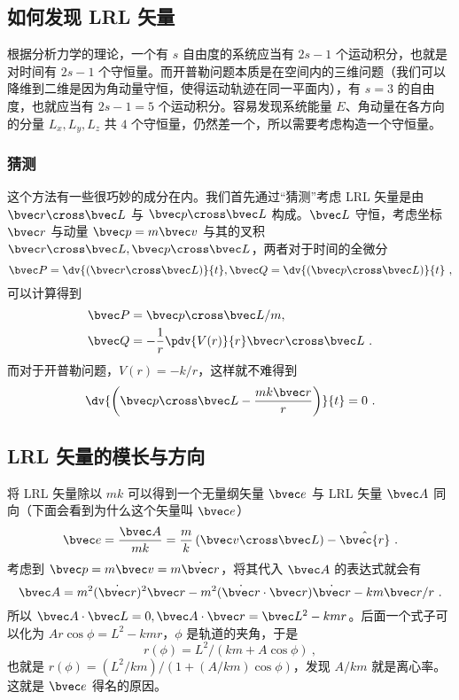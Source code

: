 \subsection{如何发现 LRL 矢量}
根据分析力学的理论，一个有 $s$ 自由度的系统应当有 $2s-1$ 个运动积分，也就是对时间有 $2s-1$ 个守恒量。而开普勒问题本质是在空间内的三维问题（我们可以降维到二维是因为角动量守恒，使得运动轨迹在同一平面内），有 $s=3$ 的自由度，也就应当有 $2s-1=5$ 个运动积分。容易发现系统能量 $E$、角动量在各方向的分量 $L_x, L_y, L_z$ 共 $4$ 个守恒量，仍然差一个，所以需要考虑构造一个守恒量。

\subsubsection{猜测}
这个方法有一些很巧妙的成分在内。我们首先通过“猜测”考虑 LRL 矢量是由 $\bvec r \cross \bvec L$ 与 $\bvec p \cross \bvec L$ 构成。$\bvec L$ 守恒，考虑坐标 $\bvec r$ 与动量 $\bvec p=m\bvec v$ 与其的叉积
$\bvec r \cross \bvec L, \bvec p \cross \bvec L$，两者对于时间的全微分
$$\bvec P= \dv{\left(\bvec r \cross \bvec L\right)}{t}, \bvec Q =\dv{\left(\bvec p \cross \bvec L\right)}{t} ~,$$
可以计算得到
$$\begin{aligned}
\bvec P &= \bvec p \cross \bvec L/m, \\
\bvec Q &= - \frac{1}{r} \pdv{V(r)}{r} \bvec r \cross \bvec L ~.
\end{aligned}$$
而对于开普勒问题，$V(r) = -k/r$，这样就不难得到
\begin{equation}
\dv{\left(\bvec p \cross \bvec L - \frac{m k \bvec r}{r}\right)}{t}=0 ~.
\end{equation}

\subsection{LRL 矢量的模长与方向}
将 LRL 矢量除以 $mk$ 可以得到一个无量纲矢量 $\bvec e$ 与 LRL 矢量 $\bvec A$ 同向（下面会看到为什么这个矢量叫 $\bvec e$）
$$\bvec e = \frac{\bvec A}{mk} = \frac{m}{k} \left(\bvec v \cross \bvec L \right)- \hat{\bvec{r}} ~.$$
考虑到 $\bvec p = m \bvec v = m \dot{\bvec r}$，将其代入 $\bvec A$ 的表达式就会有
$$\bvec A = m^2 (\dot{\bvec r})^2 \bvec r - m^2(\dot{\bvec r} \cdot \bvec r)\dot{\bvec r} - km \bvec r/r ~.$$
所以 $\bvec A \cdot \bvec L = 0, \bvec A \cdot \bvec r = \bvec L^2 - kmr$。后面一个式子可以化为 $Ar\cos \phi = L^2-kmr$，$\phi$ 是轨道的夹角，于是
$$r(\phi) = L^2/(km + A \cos \phi) ~,$$
也就是 $r(\phi) = (L^2/km)/(1+ (A/km) \cos \phi)$，发现 $A/km$ 就是离心率。这就是 $\bvec e$ 得名的原因。

